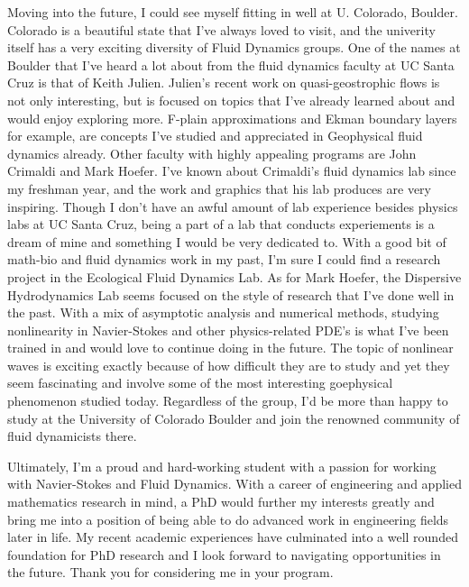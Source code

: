 \documentclass{article}
\begin{document}
Moving into the future, I could see myself fitting in well at U. Colorado, Boulder. Colorado is a beautiful state that I've always loved to visit, and the univerity itself has a very exciting diversity of Fluid Dynamics groups. One of the names at Boulder that I've heard a lot about from the fluid dynamics faculty at UC Santa Cruz is that of Keith Julien. Julien's recent work on quasi-geostrophic flows is not only interesting, but is focused on topics that I've already learned about and would enjoy exploring more. F-plain approximations and Ekman boundary layers for example, are concepts I've studied and appreciated in Geophysical fluid dynamics already. Other faculty with highly appealing programs are John Crimaldi and Mark Hoefer. I've known about Crimaldi's fluid dynamics lab since my freshman year, and the work and graphics that his lab produces are very inspiring. Though I don't have an awful amount of lab experience besides physics labs at UC Santa Cruz, being a part of a lab that conducts experiements is a dream of mine and something I would be very dedicated to. With a good bit of math-bio and fluid dynamics work in my past, I'm sure I could find a research project in the Ecological Fluid Dynamics Lab. As for Mark Hoefer, the Dispersive Hydrodynamics Lab seems focused on the style of research that I've done well in the past. With a mix of asymptotic analysis and numerical methods, studying nonlinearity in Navier-Stokes and other physics-related PDE's is what I've been trained in and would love to continue doing in the future. The topic of nonlinear waves is exciting exactly because of how difficult they are to study and yet they seem fascinating and involve some of the most interesting goephysical phenomenon studied today. Regardless of the group, I'd be more than happy to study at the University of Colorado Boulder and join the renowned community of fluid dynamicists there. 

Ultimately, I'm a proud and hard-working student with a passion for working with Navier-Stokes and Fluid Dynamics. With a career of engineering and applied mathematics research in mind, a PhD would further my interests greatly and bring me into a position of being able to do advanced work in engineering fields later in life. My recent academic experiences have culminated into a well rounded foundation for PhD research and I look forward to navigating opportunities in the future. Thank you for considering me in your program. 

\end{document}
